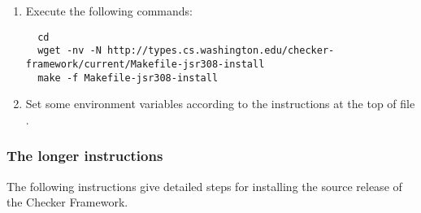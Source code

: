 \begin{enumerate}

\item
  Execute the following commands:

\begin{Verbatim}
  cd
  wget -nv -N http://types.cs.washington.edu/checker-framework/current/Makefile-jsr308-install
  make -f Makefile-jsr308-install
\end{Verbatim}

\item
Set some environment variables according to the instructions at the top of file
.

\end{enumerate}


\subsubsection{The longer instructions}

The following instructions give detailed steps for installing the source
release of the Checker Framework.

